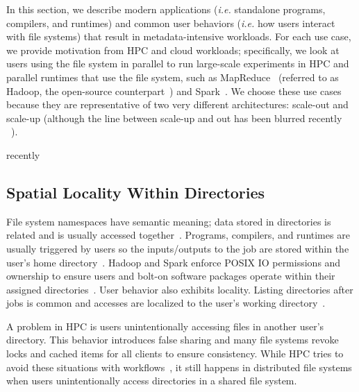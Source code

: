 In this section, we describe modern applications ({\it i.e.} standalone
programs, compilers, and runtimes) and common user behaviors ({\it i.e.} how
users interact with file systems) that result in metadata-intensive workloads.
For each use case, we provide motivation from HPC and cloud workloads;
specifically, we look at users using the file system in parallel to run
large-scale experiments in HPC and parallel runtimes that use the file system,
such as MapReduce~\cite{dean:osdi2004-mapreduce} (referred to as Hadoop, the
open-source counterpart~\cite{website:hadoop}) and
Spark~\cite{zaharia:nsdi2012-spark}.  We choose these use cases because they
are representative of two very different architectures:  scale-out and scale-up
(although the line between scale-up and out has been blurred recently
~\cite{gigaspaces:whitepaper2011-su-vs-so,
michael:2007pdps-scale-up-x-scale-out,
rowstron:hotcdp2012-hadoop-vs-single-node, sevilla:discs2013-framework
sevilla:lspp2014-supmr}).

recently
\subsection{Spatial Locality Within Directories}
\label{sec:spatial-locality-within-directories}

File system namespaces have semantic meaning; data stored in directories is
related and is usually accessed together~\cite{weil:osdi2006-ceph,
weil:sc2004-dyn-metadata}. Programs, compilers, and runtimes are usually
triggered by users so the inputs/outputs to the job are stored within the
user's home directory~\cite{weil:phdthesis07}. Hadoop and Spark enforce POSIX
IO permissions and ownership to ensure users and bolt-on software packages
operate within their assigned directories~\cite{docs:hadoopperm}.  User
behavior also exhibits locality. Listing directories after jobs is common and
accesses are localized to the user's working
directory~\cite{roselli:atec2000-FS-workloads, abad:ucc2012-mimesis}.

A problem in HPC is users unintentionally accessing files in another user's
directory. This behavior introduces false sharing and many file systems revoke
locks and cached items for all clients to ensure consistency. While HPC tries
to avoid these situations with workflows~\cite{zheng:pdsw2014-batchfs,
zheng:pdsw2015-deltafs}, it still happens in distributed file systems when
users unintentionally access directories in a shared file system. 

